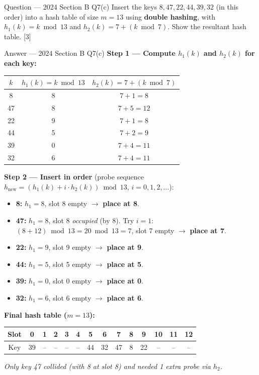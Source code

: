 \documentclass[12pt,a4paper]{article}
\begin{document}
\begin{qbox}{Question --- 2024 Section B Q7(c)}
Insert the keys $8, 47, 22, 44, 39, 32$ (in this order) into a hash table of size $m=13$ using \textbf{double hashing}, with $h_1(k) = k \bmod 13$ and $h_2(k) = 7 + (k \bmod 7)$. Show the resultant hash table. \hfill [3]
\end{qbox}

\begin{solbox}{Answer --- 2024 Section B Q7(c)}
\textbf{Step 1 --- Compute $h_1(k)$ and $h_2(k)$ for each key:}
\begin{center}
\renewcommand{\arraystretch}{1.2}
\begin{tabular}{c|c|c}
\toprule
$k$ & $h_1(k)=k\bmod 13$ & $h_2(k)=7+(k\bmod 7)$ \\
\midrule
8  & 8 & $7+1=8$ \\
47 & 8 & $7+5=12$ \\
22 & 9 & $7+1=8$ \\
44 & 5 & $7+2=9$ \\
39 & 0 & $7+4=11$ \\
32 & 6 & $7+4=11$ \\
\bottomrule
\end{tabular}
\end{center}

\textbf{Step 2 --- Insert in order} (probe sequence $h_{\text{new}}=(h_1(k)+i\cdot h_2(k))\bmod 13$, $i=0,1,2,\dots$):
\begin{itemize}[noitemsep]
  \item \textbf{8:} $h_1=8$, slot 8 empty $\to$ \textbf{place at 8}.
  \item \textbf{47:} $h_1=8$, slot 8 \emph{occupied} (by 8). Try $i=1$: $(8+12)\bmod 13 = 20\bmod13 = 7$, slot 7 empty $\to$ \textbf{place at 7}.
  \item \textbf{22:} $h_1=9$, slot 9 empty $\to$ \textbf{place at 9}.
  \item \textbf{44:} $h_1=5$, slot 5 empty $\to$ \textbf{place at 5}.
  \item \textbf{39:} $h_1=0$, slot 0 empty $\to$ \textbf{place at 0}.
  \item \textbf{32:} $h_1=6$, slot 6 empty $\to$ \textbf{place at 6}.
\end{itemize}

\textbf{Final hash table ($m=13$):}
\begin{center}
\renewcommand{\arraystretch}{1.2}
\begin{tabular}{c|c|c|c|c|c|c|c|c|c|c|c|c|c}
\toprule
Slot & 0 & 1 & 2 & 3 & 4 & 5 & 6 & 7 & 8 & 9 & 10 & 11 & 12 \\
\midrule
Key  & 39 & -- & -- & -- & -- & 44 & 32 & 47 & 8 & 22 & -- & -- & -- \\
\bottomrule
\end{tabular}
\end{center}
\textit{Only key 47 collided (with 8 at slot 8) and needed 1 extra probe via $h_2$.}
\end{solbox}
\end{document}
